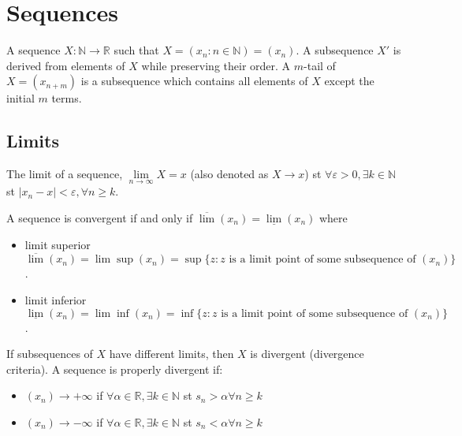 \documentclass{article}
\begin{document}
\section{Sequences}

A sequence $X: \mathbb{N} \rightarrow \mathbb{R}$ such that $X = (x_n: n \in \mathbb{N}) = (x_n)$. A subsequence $X'$ is derived from elements of $X$ while preserving their order. A $m$-tail of $X = (x_{n+m})$ is a subsequence which contains all elements of $X$ except the initial $m$ terms.

\subsection{Limits}

The limit of a sequence, $\lim\limits_{n \rightarrow \infty} X = x$ (also denoted as $X \rightarrow x$) st $\forall \varepsilon > 0, \exists k \in \mathbb{N}$ st $|x_n-x|<\varepsilon, \forall n \geq k$.

A sequence is convergent if and only if $\overline{\lim}(x_n) = \underline{\lim}(x_n)$ where
\begin{itemize}
	\item limit superior $\overline{\lim}(x_n) = \lim \sup (x_n) = \sup\{z: z \text{ is a limit point of some subsequence of } (x_n)\}$.
	\item limit inferior $\underline{\lim}(x_n) = \lim \inf (x_n) = \inf\{z: z \text{ is a limit point of some subsequence of } (x_n)\}$.
\end{itemize}

If subsequences of $X$ have different limits, then $X$ is divergent (divergence criteria). A sequence is properly divergent if:
\begin{itemize}
	\item $(x_n) \rightarrow + \infty$ if $\forall \alpha \in \mathbb{R}, \exists k \in \mathbb{N}$ st $s_n > \alpha \forall n \geq k$
	\item $(x_n) \rightarrow - \infty$ if $\forall \alpha \in \mathbb{R}, \exists k \in \mathbb{N}$ st $s_n < \alpha \forall n \geq k$
\end{itemize}
\end{document}
